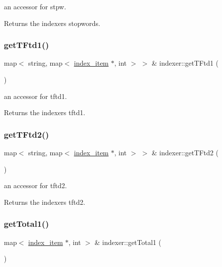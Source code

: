 an accessor for stpw. 

\begin{DoxyReturn}{Returns}
the indexer\textquotesingle{}s stopwords. 
\end{DoxyReturn}
\mbox{\label{classindexer_ad2afffef1c97feb0c7934951ce35319c}} 
\subsubsection{\texorpdfstring{get\+T\+Ftd1()}{getTFtd1()}}
{\footnotesize\ttfamily map$<$ string, map$<$ \hyperlink{classindex__item}{index\+\_\+item} $\ast$, int $>$ $>$ \& indexer\+::get\+T\+Ftd1 (\begin{DoxyParamCaption}{ }\end{DoxyParamCaption})}



an accessor for tftd1. 

\begin{DoxyReturn}{Returns}
the indexer\textquotesingle{}s tftd1. 
\end{DoxyReturn}
\mbox{\label{classindexer_ab819d6ad0ae7fb00254a5d41f4cc92cd}} 
\subsubsection{\texorpdfstring{get\+T\+Ftd2()}{getTFtd2()}}
{\footnotesize\ttfamily map$<$ string, map$<$ \hyperlink{classindex__item}{index\+\_\+item} $\ast$, int $>$ $>$ \& indexer\+::get\+T\+Ftd2 (\begin{DoxyParamCaption}{ }\end{DoxyParamCaption})}



an accessor for tftd2. 

\begin{DoxyReturn}{Returns}
the indexer\textquotesingle{}s tftd2. 
\end{DoxyReturn}
\mbox{\label{classindexer_a8886ee24d98c5129a6582a95f65e31f6}} 
\subsubsection{\texorpdfstring{get\+Total1()}{getTotal1()}}
{\footnotesize\ttfamily map$<$ \hyperlink{classindex__item}{index\+\_\+item} $\ast$, int $>$ \& indexer\+::get\+Total1 (\begin{DoxyParamCaption}{ }\end{DoxyParamCaption})}



